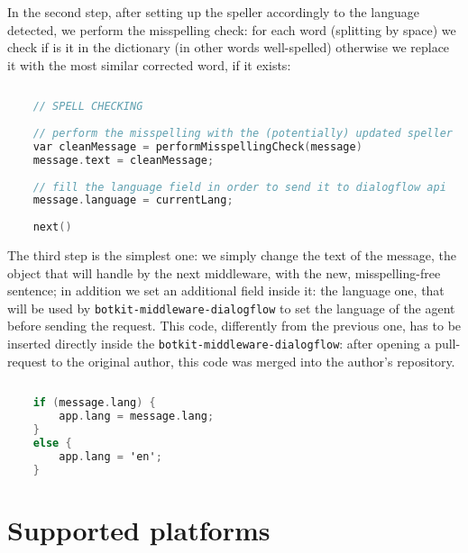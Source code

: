 	In the second step, after setting up the speller accordingly to the language detected, we perform the misspelling check: for each word (splitting by space) we check if is it in the dictionary (in other words well-spelled) otherwise we replace it with the most similar corrected word, if it exists:
	
	\begin{lstlisting}[language=C]
	
	// SPELL CHECKING
	
	// perform the misspelling with the (potentially) updated speller
	var cleanMessage = performMisspellingCheck(message)
	message.text = cleanMessage;
	
	// fill the language field in order to send it to dialogflow api
	message.language = currentLang;
	
	next()
	\end{lstlisting}
	
	The third step is the simplest one: we simply change the text of the message, the object that will handle by the next middleware, with the new, misspelling-free sentence; in addition we set an additional field inside it: the language one, that will be used by \texttt{botkit-middleware-dialogflow} to set the language of the agent before sending the request. This code, differently from the previous one, has to be inserted directly inside the \texttt{botkit-middleware-dialogflow}: after opening a pull-request to the original author, this code was merged into the author's repository.
	
	\begin{lstlisting}[language=C]
	
	if (message.lang) {
		app.lang = message.lang;
	}
	else {
		app.lang = 'en';
	}
	\end{lstlisting}
	
	\section{Supported platforms}
	
